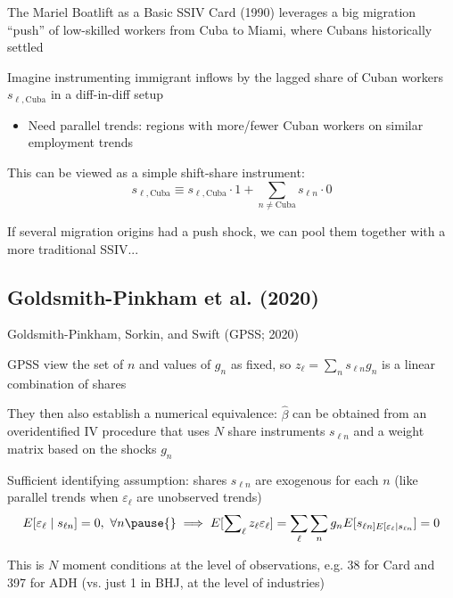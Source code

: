 \documentclass{beamer}
\begin{document}
\begin{frame}{The Mariel Boatlift as a Basic SSIV}
Card (1990) leverages a big migration ``push'' of low-skilled workers from Cuba to Miami, where Cubans historically settled
\medskip\pause{}

Imagine instrumenting immigrant inflows by the lagged share of Cuban workers $s_{\ell, \text{Cuba}}$ in a diff-in-diff setup\smallskip
	\begin{itemize}
	\item Need parallel trends: regions with more/fewer Cuban workers on similar employment trends
	\medskip\pause{}
	\end{itemize}	
This can be viewed as a simple shift-share instrument: $$s_{\ell, \text{Cuba}}\equiv s_{\ell,\text{Cuba}}\cdot 1+\sum_{n\ne\text{Cuba}} s_{\ell n}\cdot 0$$
\pause{}

\vspace{-0.4cm}If several migration origins had a push shock, we can pool them together with a more traditional SSIV...

\end{frame}

\subsection{Goldsmith-Pinkham et al. (2020)}
\begin{frame}{Goldsmith-Pinkham, Sorkin, and Swift (GPSS; 2020)} 

 GPSS view the set of $n$ and values of $g_n$ as fixed, so $z_\ell=\sum_n s_{\ell n} g_n$ is a linear combination of shares
\medskip\pause{}

They then also establish a numerical equivalence:
$\hat{\beta}$ can be obtained from an overidentified IV procedure that uses $N$ share instruments $s_{\ell n}$ and a weight matrix based on the shocks $g_n$
\medskip\pause{}

Sufficient identifying assumption: shares $s_{\ell n}$ are exogenous for each $n$ (like parallel trends when $\varepsilon_\ell$ are unobserved trends)\smallskip
\begin{align*}
E[\varepsilon_\ell\mid s_{\ell n}]=0,\text{ }\forall n \pause{}\implies E[\sum_\ell\nolimits z_\ell\varepsilon_\ell]=\sum_\ell\sum_n g_nE[s_{\ell n]E[\varepsilon_\ell\mid s_{\ell n}}]=0
\end{align*}\pause{}\vspace{-0.4cm}

This is $N$ moment conditions at the level of observations, e.g. 38 for Card and 397 for ADH (vs. just 1 in BHJ, at the level of industries)

\end{frame}
\end{document}
